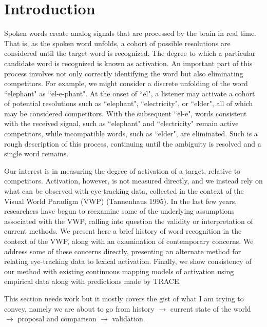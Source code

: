 \documentclass{article}
\begin{document}
\section{Introduction}

Spoken words create analog signals that are processed by the brain in real time. That is, as the spoken word unfolds, a cohort of possible resolutions are considered until the target word is recognized. The degree to which a particular candidate word is recognized is known as activation. An important part of this process involves not only correctly identifying the word but also eliminating competitors. For example, we might consider a discrete unfolding of the word ``elephant" as ``el-e-phant". At the onset of ``el", a listener may activate a cohort of potential resolutions such as ``elephant", ``electricity", or ``elder", all of which may be considered competitors. With the subsequent ``el-e", words consistent with the received signal, such as ``elephant" and ``electricity" remain active competitors, while incompatible words, such as ``elder", are eliminated. Such is a rough description of this process, continuing until the ambiguity is resolved and a single word remains.



Our interest is in measuring the degree of activation of a target, relative to competitors. Activation, however, is not measured directly, and we instead rely on what can be observed with eye-tracking data, collected in the context of the Visual World Paradigm (VWP) (Tannenhaus 1995). In the last few years, researchers have begun to reexamine some of the underlying assumptions associated with the VWP, calling into question the validity or interpretation of current methods. We present here a brief history of word recognition in the context of the VWP, along with an examination of contemporary concerns. We address some of these concerns directly, presenting an alternate method for relating eye-tracking data to lexical activation. Finally, we show consistency of our method with existing continuous mapping models of activation using empirical data along with predictions made by TRACE.


This section needs work but it mostly covers the gist of what I am trying to convey, namely we are about to go from history $\rightarrow$ current state of the world $\rightarrow$ proposal and comparison $\rightarrow$ validation.
\end{document}
